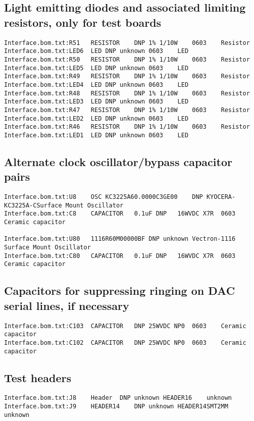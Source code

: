 \documentclass[11pt]{article}
\begin{document}
\subsection{Light emitting diodes and associated limiting resistors, only for test boards}
\begin{verbatim}
Interface.bom.txt:R51	RESISTOR	DNP	1% 1/10W	0603	Resistor	
Interface.bom.txt:LED6	LED	DNP	unknown	0603	LED	
Interface.bom.txt:R50	RESISTOR	DNP	1% 1/10W	0603	Resistor	
Interface.bom.txt:LED5	LED	DNP	unknown	0603	LED	
Interface.bom.txt:R49	RESISTOR	DNP	1% 1/10W	0603	Resistor	
Interface.bom.txt:LED4	LED	DNP	unknown	0603	LED	
Interface.bom.txt:R48	RESISTOR	DNP	1% 1/10W	0603	Resistor	
Interface.bom.txt:LED3	LED	DNP	unknown	0603	LED	
Interface.bom.txt:R47	RESISTOR	DNP	1% 1/10W	0603	Resistor	
Interface.bom.txt:LED2	LED	DNP	unknown	0603	LED	
Interface.bom.txt:R46	RESISTOR	DNP	1% 1/10W	0603	Resistor	
Interface.bom.txt:LED1	LED	DNP	unknown	0603	LED	
\end{verbatim}

\subsection{Alternate clock oscillator/bypass capacitor pairs}
\begin{verbatim}
Interface.bom.txt:U8	OSC	KC3225A60.0000C3GE00	DNP	KYOCERA-KC3225A-CSurface Mount Oscillator
Interface.bom.txt:C8	CAPACITOR	0.1uF DNP	16WVDC X7R	0603	Ceramic capacitor	

Interface.bom.txt:U80	1116R60M00000BF	DNP	unknown	Vectron-1116	Surface Mount Oscillator	
Interface.bom.txt:C80	CAPACITOR	0.1uF DNP	16WVDC X7R	0603	Ceramic capacitor	
\end{verbatim}

\subsection{Capacitors for suppressing ringing on DAC serial lines, if necessary}
\begin{verbatim}
Interface.bom.txt:C103	CAPACITOR	DNP	25WVDC NP0	0603	Ceramic capacitor	
Interface.bom.txt:C102	CAPACITOR	DNP	25WVDC NP0	0603	Ceramic capacitor	
\end{verbatim}

\subsection{Test headers}
\begin{verbatim}
Interface.bom.txt:J8	Header	DNP	unknown	HEADER16	unknown	
Interface.bom.txt:J9	HEADER14	DNP	unknown	HEADER14SMT2MM	unknown	
\end{verbatim}
\end{document}
